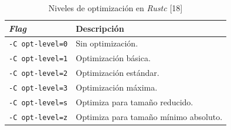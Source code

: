 \begin{table}[H]
\centering
\small
\begin{tabularx}{\linewidth}{|l|Y|}
\hline
\textbf{\emph{Flag}} & \textbf{Descripción} \\
\hline
\texttt{-C opt-level=0} & Sin optimización. \\
\texttt{-C opt-level=1} & Optimización básica. \\
\texttt{-C opt-level=2} & Optimización estándar. \\
\texttt{-C opt-level=3} & Optimización máxima. \\
\texttt{-C opt-level=s} & Optimiza para tamaño reducido. \\
\texttt{-C opt-level=z} & Optimiza para tamaño mínimo absoluto. \\
\hline
\end{tabularx}
\caption{Niveles de optimización en \emph{Rustc} [18]}
\label{tab:rust_optimizacion}
\end{table}

